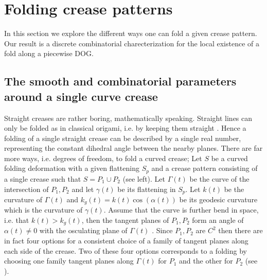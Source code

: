 \section{Folding crease patterns} \label{sec:folding}
In this section we explore the different ways one can fold a given crease pattern. Our result is a discrete combinatorial charecterization for the local existence of a fold along a piecewise DOG.

\subsection{The smooth and combinatorial parameters around a single curve crease}
Straight creases are rather boring, mathematically speaking. Straight lines can only be folded as in classical origami, i.e. by keeping them straight \cite{demaine_lens}. Hence a folding of a single straight crease can be described by a single real number, representing the constant dihedral angle between the nearby planes. There are far more ways, i.e. degrees of freedom, to fold a curved crease; Let $S$ be a curved folding deformation with a given flattening $S_p$ and a crease pattern consisting of a single crease such that $S = P_1 \cup P_2$ (see  left). Let $\Gamma(t)$ be the curve of the intersection of $P_1,P_2$ and let $\gamma(t)$ be its flattening in $S_p$. Let $k(t)$ be the curvature of $\Gamma(t)$ and $k_g(t) = k(t) \cos(\alpha(t))$ be its geodesic curvature which is the curvature of $\gamma(t)$. Assume that the curve is further bend in space, i.e. that $k(t) > k_g(t)$, then the tangent planes of $P_1,P_2$ form an angle of $\alpha(t) \neq 0$ with the osculating plane of $\Gamma(t)$ \cite{more_on_paper,duncan_folded}. Since $P_1,P_2$ are $C^2$ then there are in fact four options for a consistent choice of a family of tangent planes along each side of the crease. Two of these four options corresponds to a folding by choosing one family tangent planes along $\Gamma(t)$ for $P_1$ and the other for $P_2$ (see ).
